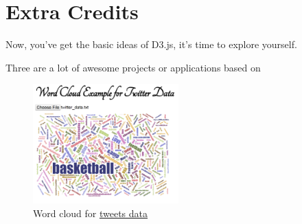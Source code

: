 \documentclass[a4paper, 11pt]{article}
\begin{document}
\section{Extra Credits}
Now, you've get the basic ideas of D3.js, it's time to explore yourself.

Three are a lot of awesome projects or applications based on 

\begin{figure}[h!]
  \centering
      \includegraphics[width=0.5\textwidth]{word_cloud.png}
  \caption{Word cloud for \href{http://nymph332088.github.io/CIS4340/labassignments/Lab2/twitter_data.txt}{tweets data}}
  \label{fig:wordcloud}
\end{figure}
\end{document}
